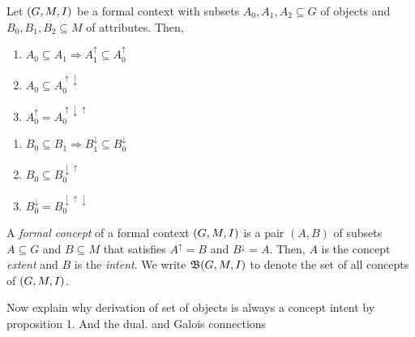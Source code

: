 \begin{proposition}
  \label{proposition:properties-about-derivation-operators}
  Let $(G,M,I)$ be a formal context with subsets $A_0, A_1, A_2 \subseteq G$ of objects and $B_0, B_1, B_2 \subseteq M$ of attributes. Then,
  \begin{center}
    \begin{minipage}[t]{0.48\textwidth}
      \begin{enumerate}
        \item $A_0 \subseteq A_1 \Rightarrow A_1^\uparrow \subseteq A_0^\uparrow$
        \item $A_0 \subseteq A_0^{\uparrow \downarrow}$
        \item $A_0^\uparrow = A_0^{\uparrow \downarrow \uparrow}$
      \end{enumerate}
    \end{minipage}%
    \hfill
    \begin{minipage}[t]{0.48\textwidth}
      \begin{enumerate}
        \item $B_0 \subseteq B_1 \Rightarrow B_1^\downarrow \subseteq B_0^\downarrow$
        \item $B_0 \subseteq B_0^{\downarrow \uparrow}$
        \item $B_0^\downarrow = B_0^{\downarrow \uparrow \downarrow}$
      \end{enumerate}
    \end{minipage}
  \end{center}
\end{proposition}

\begin{definition}
  \label{definition:formal-concept}
  A \textit{formal concept} of a formal context $(G,M,I)$ is a pair $(A,B)$ of subsets $A \subseteq G$ and $B \subseteq M$ that satisfies $A^\uparrow = B$ and $B^\downarrow = A$. Then, $A$ is the concept \textit{extent} and $B$ is the \textit{intent}. We write $\mathfrak{B}(G,M,I)$ to denote the set of all concepts of $(G,M,I)$.
\end{definition}

Now explain why derivation of set of objects is always a concept intent by proposition 1. And the dual. and Galois connections

